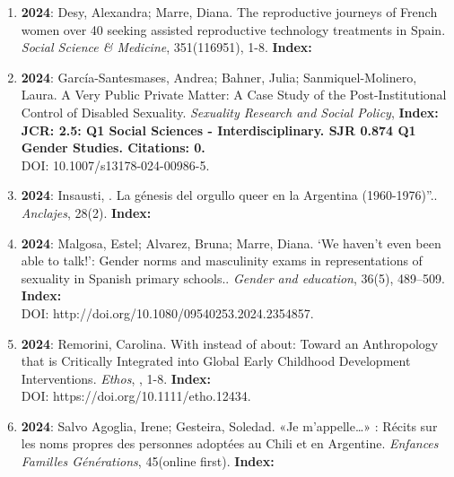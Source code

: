 \begin{enumerate}
\item {\bf 2024}: Desy, Alexandra; Marre, Diana.  The reproductive journeys of French women over 40 seeking assisted reproductive technology treatments in Spain. {\it Social Science \& Medicine}, 351(116951), 1-8. {\bf Index: } \filbreak
\item {\bf 2024}: García-Santesmases, Andrea; Bahner, Julia; Sanmiquel-Molinero, Laura.  A Very Public Private Matter: A Case Study of the Post-Institutional Control of Disabled Sexuality. {\it Sexuality Research and Social Policy}, {\bf Index: JCR: 2.5: Q1 Social Sciences - Interdisciplinary.  SJR 0.874 Q1 Gender Studies. Citations: 0. } \\ DOI: 10.1007/s13178-024-00986-5. \filbreak
\item {\bf 2024}: Insausti, .  La génesis del orgullo queer en la Argentina (1960-1976)”.. {\it Anclajes}, 28(2). {\bf Index: } \filbreak
\item {\bf 2024}: Malgosa, Estel; Alvarez, Bruna; Marre, Diana.  ‘We haven’t even been able to talk!’: Gender norms and masculinity exams in representations of sexuality in Spanish primary schools.. {\it Gender and education}, 36(5), 489–509. {\bf Index: } \\ DOI: http://doi.org/10.1080/09540253.2024.2354857. \filbreak
\item {\bf 2024}: Remorini, Carolina.  With instead of about: Toward an Anthropology that is Critically Integrated into Global Early Childhood Development Interventions. {\it Ethos}, , 1-8. {\bf Index: } \\ DOI: https://doi.org/10.1111/etho.12434. \filbreak
\item {\bf 2024}: Salvo Agoglia, Irene; Gesteira, Soledad.  «Je m’appelle…» : Récits sur les noms propres des personnes adoptées au Chili et en Argentine. {\it Enfances Familles Générations}, 45(online first). {\bf Index: } \filbreak
\end{enumerate} 
